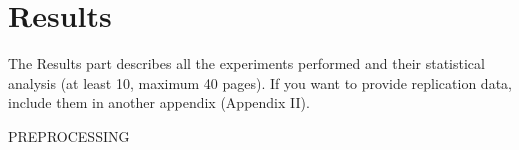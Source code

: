 \graphicspath{{chapters/05_results/}}
\chapter{Results}

The Results part describes all the experiments performed and their statistical analysis (at
least 10, maximum 40 pages). If you want to provide replication data, include them in another
appendix (Appendix II).

PREPROCESSING 
